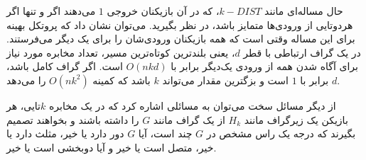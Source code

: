 حال مساله‌ای مانند $k-DIST$، که در آن بازیکنان خروجی $1$ می‌دهند اگر و تنها اگر هردوتایی از ورودی‌ها متمایز باشد، در نظر بگیرید. می‌توان نشان داد که پروتکل بهینه برای این مساله وقتی است که همه بازیکنان ورودی‌شان را برای یک دیگر می‌فرستند. در یک گراف ارتباطی با قطر $d$، یعنی بلندترین کوتاه‌ترین مسیر، تعداد مخابره مورد نیاز برای آگاه شدن همه از ورودی یک‌دیگر برابر با $O(nkd)$ است. اگر گراف کامل باشد، $d$ برابر با $1$ است و بزگترین مقدار می‌تواند $k$ باشد که کمینه $O(nk^{2})$ را می‌دهد. 

 از دیگر مسائل سخت می‌توان به مسائلی اشاره کرد که در یک مخابره $k$تایی، هر بازیکن یک زیرگراف مانند $H_{k}$ از یک گراف مانند $G$ را داشته باشند و بخواهند تصمیم بگیرند که درجه یک راس مشخص در $G$ چند است، آیا $G$ دور دارد یا خیر، مثلث دارد یا خیر، متصل است یا خیر و آیا دوبخشی است یا خیر. \cite{arkadev14}
 